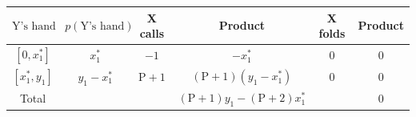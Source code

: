 \documentclass[border=3pt]{standalone}
\begin{document}
{\Large
\renewcommand{\arraystretch}{1.3}
\begin{tabular}{|c|c|c|c|c|c|}
\hline
    $\mathrm{Y}\text{'s hand}$ &
    $p(\mathrm{Y}\text{'s hand})$ &
    X calls &
    Product &
    X folds &
    Product \\
\hline
    $[0, x_1^*]$ & $x_1^*$ & $-1$ & $-x_1^*$ & $0$ & $0$ \\
\hline
    $[x_1^*, y_1]$ & $y_1 - x_1^*$ & $\mathrm{P}+1$ &
    $(\mathrm{P}+1)(y_1 - x_1^*)$ & $0$ & $0$ \\
\hline
    Total & & & $(\mathrm{P}+1)y_1 - (\mathrm{P}+2)x_1^*$ & & $0$ \\
\hline
\end{tabular}
}
\end{document}
